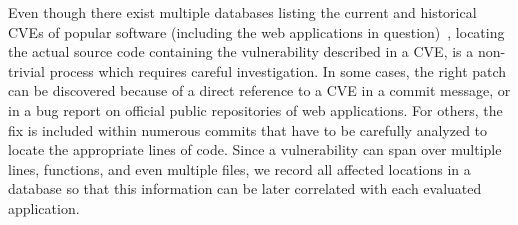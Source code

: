 Even though there exist multiple databases listing the current and
historical CVEs of popular software (including the web applications in
question)~\cite{cvedetails,nistgov}, locating the actual source code
containing the vulnerability described in a CVE, is a non-trivial process
which requires careful investigation. In some cases, the right patch can be
discovered because of a direct reference to a CVE in a commit message, or in
a bug report on official public repositories of web applications. For others,
the fix is included within numerous commits that have to be carefully analyzed
to locate the appropriate lines of code. Since a vulnerability can span over
multiple lines, functions, and even multiple files, we record all affected
locations in a database so that this information can be later correlated
with each evaluated application.



